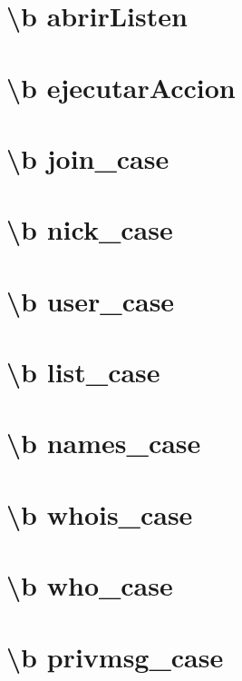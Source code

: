 \documentclass[twoside]{book}
\begin{document}
\chapter{\textbackslash{}b abrir\-Listen}
\label{abrirListen}
\hypertarget{abrirListen}{}

\chapter{\textbackslash{}b ejecutar\-Accion}
\label{ejecutarAccion}
\hypertarget{ejecutarAccion}{}

\chapter{\textbackslash{}b join\-\_\-case}
\label{join_case}
\hypertarget{join_case}{}

\chapter{\textbackslash{}b nick\-\_\-case}
\label{nick_case}
\hypertarget{nick_case}{}

\chapter{\textbackslash{}b user\-\_\-case}
\label{user_case}
\hypertarget{user_case}{}

\chapter{\textbackslash{}b list\-\_\-case}
\label{list_case}
\hypertarget{list_case}{}

\chapter{\textbackslash{}b names\-\_\-case}
\label{names_case}
\hypertarget{names_case}{}

\chapter{\textbackslash{}b whois\-\_\-case}
\label{whois_case}
\hypertarget{whois_case}{}

\chapter{\textbackslash{}b who\-\_\-case}
\label{who_case}
\hypertarget{who_case}{}

\chapter{\textbackslash{}b privmsg\-\_\-case}
\label{privmsg_case}
\hypertarget{privmsg_case}{}

\end{document}
